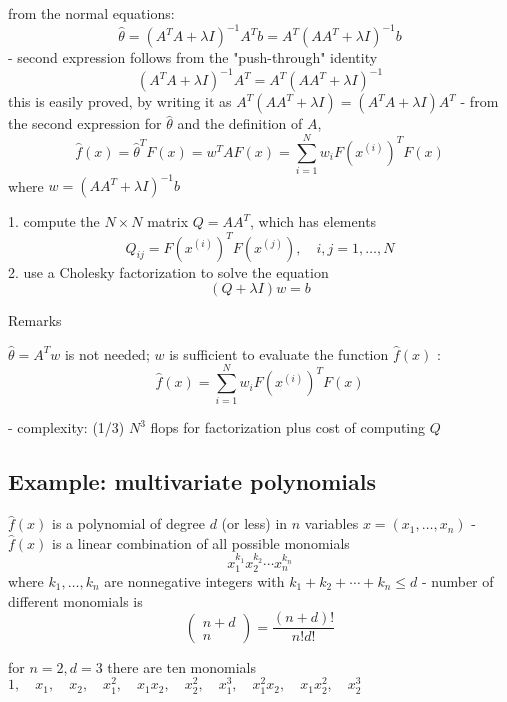 from the normal equations:
$$
\hat{\theta}=\left(A^{T} A+\lambda I\right)^{-1} A^{T} b=A^{T}\left(A A^{T}+\lambda I\right)^{-1} b
$$
- second expression follows from the "push-through" identity
$$
\left(A^{T} A+\lambda I\right)^{-1} A^{T}=A^{T}\left(A A^{T}+\lambda I\right)^{-1}
$$
this is easily proved, by writing it as $A^{T}\left(A A^{T}+\lambda I\right)=\left(A^{T} A+\lambda I\right) A^{T}$
- from the second expression for $\hat{\theta}$ and the definition of $A$,
$$
\hat{f}(x)=\hat{\theta}^{T} F(x)=w^{T} A F(x)=\sum_{i=1}^{N} w_{i} F\left(x^{(i)}\right)^{T} F(x)
$$
where $w=\left(A A^{T}+\lambda I\right)^{-1} b$

\begin{algorithm}
    1. compute the $N \times N$ matrix $Q=A A^{T}$, which has elements
$$
Q_{i j}=F\left(x^{(i)}\right)^{T} F\left(x^{(j)}\right), \quad i, j=1, \ldots, N
$$
2. use a Cholesky factorization to solve the equation
$$
(Q+\lambda I) w=b
$$
\end{algorithm}


Remarks

\begin{remark}
    $\hat{\theta}=A^{T} w$ is not needed; $w$ is sufficient to evaluate the function $\hat{f}(x)$ :
$$
\hat{f}(x)=\sum_{i=1}^{N} w_{i} F\left(x^{(i)}\right)^{T} F(x)
$$
\end{remark}

- complexity: (1/3) $N^{3}$ flops for factorization plus cost of computing $Q$

\subsection{Example: multivariate polynomials}


$\hat{f}(x)$ is a polynomial of degree $d$ (or less) in $n$ variables $x=\left(x_{1}, \ldots, x_{n}\right)$
- $\hat{f}(x)$ is a linear combination of all possible monomials
$$
x_{1}^{k_{1}} x_{2}^{k_{2}} \cdots x_{n}^{k_{n}}
$$
where $k_{1}, \ldots, k_{n}$ are nonnegative integers with $k_{1}+k_{2}+\cdots+k_{n} \leq d$
- number of different monomials is
$$
\left(\begin{array}{c}
n+d \\
n
\end{array}\right)=\frac{(n+d) !}{n ! d !}
$$

\begin{example}
    for $n=2, d=3$ there are ten monomials
$1, \quad x_{1}, \quad x_{2}, \quad x_{1}^{2}, \quad x_{1} x_{2}, \quad x_{2}^{2}, \quad x_{1}^{3}, \quad x_{1}^{2} x_{2}, \quad x_{1} x_{2}^{2}, \quad x_{2}^{3}$
\end{example}


